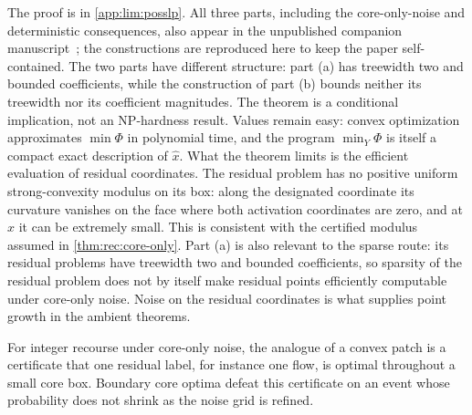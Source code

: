 The proof is in \cref{app:lim:posslp}. All three parts, including the
core-only-noise and deterministic consequences, also appear in the
unpublished companion manuscript~\citep{companion-exact-arithmetic}; the
constructions are reproduced here to keep the paper self-contained. The two parts have different structure:
part (a) has treewidth two and bounded coefficients, while the construction
of part (b) bounds neither its treewidth nor its coefficient magnitudes. The
theorem is a conditional implication, not an NP-hardness result. Values
remain easy: convex optimization approximates $\min\Phi$ in polynomial time,
and the program $\min_Y\Phi$ is itself a compact exact description of
$\hat x$. What the theorem limits is the efficient evaluation of residual
coordinates. The residual problem has no positive uniform strong-convexity
modulus on its box: along the designated coordinate its curvature vanishes
on the face where both activation coordinates are zero, and at $\hat x$ it
can be extremely small. This is consistent with the certified modulus
assumed in \cref{thm:rec:core-only}. Part (a) is also relevant to the sparse
route: its residual problems have treewidth two and bounded coefficients,
so sparsity of the residual problem does not by itself make residual points
efficiently computable under core-only noise. Noise on the residual
coordinates is what supplies point growth in the ambient theorems.

For integer recourse under core-only noise, the analogue of a convex patch
is a certificate that one residual label, for instance one flow, is optimal
throughout a small core box. Boundary core optima defeat this certificate on
an event whose probability does not shrink as the noise grid is refined.

